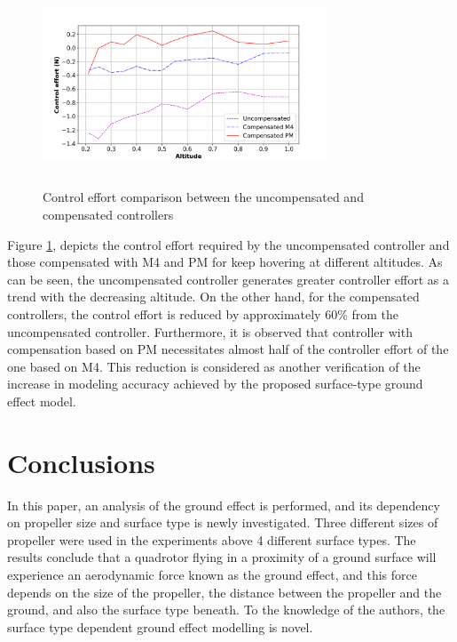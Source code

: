 \documentclass[twocolumn,10pt]{asme2ej}
\begin{document}
\begin{figure}[t]
  \begin{center}
  \setlength{\unitlength}{0.012500in}%
  \includegraphics[width=8.5cm,height=6cm]{Images/effort_comp.png}
 \end{center}
  \caption{Control effort comparison between the uncompensated and compensated controllers}
  \label{effort_comp}
\end{figure}

Figure \ref{effort_comp}, depicts the control effort required by the uncompensated controller and those compensated with M4 and PM for keep hovering at different altitudes. As can be seen, the uncompensated controller generates greater controller effort as a trend with the decreasing altitude. On the other hand, for the compensated controllers, the control effort is reduced by approximately 60\% from the uncompensated controller. Furthermore, it is observed that controller with compensation based on PM necessitates almost half of the controller effort of the one based on M4. This reduction is considered as another verification of the increase in modeling accuracy achieved by the proposed surface-type ground effect model.

\section{Conclusions}
In this paper, an analysis of the ground effect is performed, and its dependency on propeller size and surface type is  newly investigated. Three different sizes of propeller were used in the experiments above 4 different surface types. The results conclude that a quadrotor flying in a proximity of a ground surface will experience an aerodynamic force known as the ground effect, and this force depends on the size of the propeller, the distance between the propeller and the ground, and also the surface type beneath. To the knowledge of the authors, the surface type dependent ground effect modelling is novel.
\end{document}
